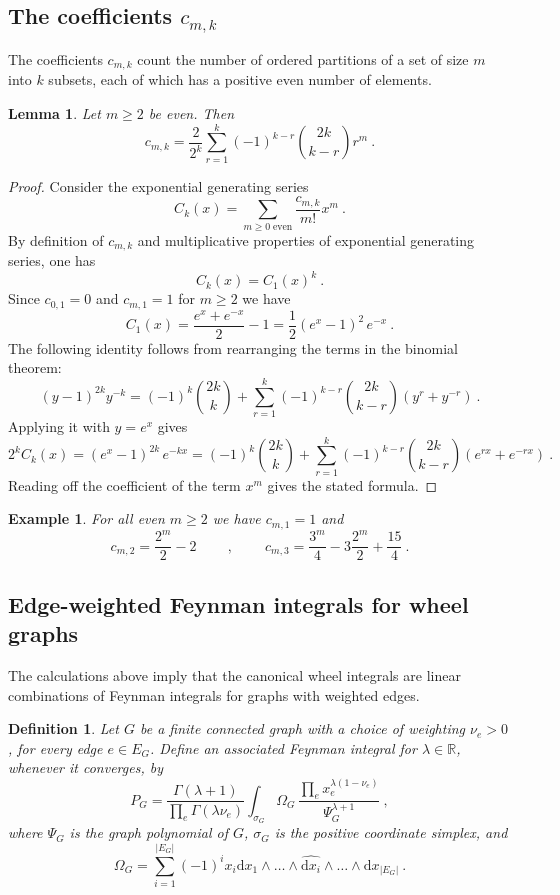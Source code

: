 \documentclass[10pt]{amsart}
\newcommand{\RR}{{\mathbb R}}
\newcommand{\dd}{\mathrm{d}}
\theoremstyle{plain}
\newtheorem{lem}[thm]{Lemma}
\newtheorem{defn}[thm]{Definition}
\newtheorem{ex}[thm]{Example}
\newcommand{\0}{\color{blue}{\mathsf{0}}}
\begin{document}
\subsection{The coefficients   \texorpdfstring{$c_{m,k}$}{c}}
The coefficients $c_{m,k}$ count the number of ordered  partitions of  a set  of size $m$ into $k$ subsets, each of which has a positive  even number of elements. 
\begin{lem} \label{lem: cmk}
Let $m\geq2$ be even. Then 
\begin{equation}\label{ceq1}
c_{m,k}  =    \frac{2}{2^k}   \sum_{r=1}^k (-1)^{k-r} \binom{2k}{k-r} r^{m}  \ . 
\end{equation}
\end{lem}

\begin{proof}Consider the  exponential generating series
\[ C_k(x)= \sum_{m\geq0\;\text{even}} \frac{c_{m,k}}{m!} x^m\ .\]
By definition of $c_{m,k}$ and multiplicative properties of exponential generating series, one has
\[ C_k(x) = C_1(x)^k \ .\]
Since $c_{0,1}=0$ and $c_{m,1}=1$ for $m\geq2$ we have
\[ C_1(x) = \frac{e^x + e^{-x}}{2} -1 =   \frac{1}{2} (e^{x} -1)^2 \, e^{-x}\ .\]
The following identity follows from rearranging the terms in the binomial theorem:
\[ \left(y-1\right)^{2k} y^{-k} =(-1)^{k} \binom{2k}{k} +   \sum_{r=1}^k (-1)^{k-r} \binom{2k}{k-r}(y^r+y^{-r})\ .  \]
Applying it with $y=e^x$ gives
\[ 2^k  C_k(x) =     (e^{x} -1)^{2k} \, e^{-kx} = (-1)^{k} \binom{2k}{k} +   \sum_{r=1}^k (-1)^{k-r} \binom{2k}{k-r}(e^{rx}+e^{-rx})\ .   \]
Reading off the coefficient of the term $x^m$ gives the stated formula.
\end{proof}

\begin{ex}\label{ex120}
For all even $m\geq 2$ we  have $c_{m,1}=1$ and 
\[ c_{m,2} = \frac{2^m}{2}-2\   \qquad  , \qquad  \ c_{m,3}= \frac{3^m}{4} -3 \frac{2^m}{2}+ \frac{15}{4}\  . \]
\end{ex}

\subsection{Edge-weighted Feynman integrals for  wheel graphs}
The calculations above imply that the canonical wheel integrals are linear combinations of Feynman integrals for graphs with weighted edges. 
\begin{defn} Let $G$ be a finite connected graph with a choice of weighting $\nu_e>0$, for every edge $e\in E_G$.     Define an associated Feynman integral for $\lambda\in\RR$,  whenever it converges, by
\begin{equation}\label{pareq}
P_G=\frac{\Gamma(\lambda+1)}{\prod_e\Gamma(\lambda\nu_e)}\int_{\sigma_G} \Omega_G\,\frac{\prod_ex_e^{\lambda(1-\nu_e)}}{\Psi_G^{\lambda+1}}\ ,
\end{equation}
where $\Psi_G$ is the graph polynomial of $G$, $\sigma_G$ is the positive coordinate simplex, and
$$
\Omega_G=\sum_{i=1}^{|E_G|}(-1)^ix_i\dd x_1\wedge\ldots\wedge\widehat{\dd x_i}\wedge\ldots\wedge\dd x_{|E_G|}\ .
$$
\end{defn}
\end{document}
